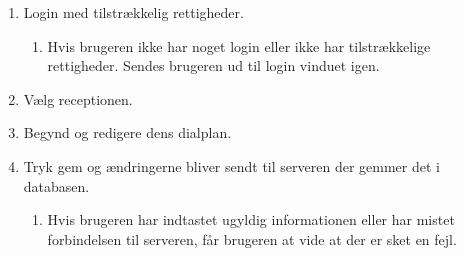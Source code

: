 \begin{enumerate}
    \item Login med tilstrækkelig rettigheder.
  \begin{enumerate}
    \item Hvis brugeren ikke har noget login eller ikke har tilstrækkelige rettigheder. Sendes brugeren ud til login vinduet igen.
  \end{enumerate}
    \item Vælg receptionen.
    \item Begynd og redigere dens dialplan.
    \item Tryk gem og ændringerne bliver sendt til serveren der gemmer det i databasen.
  \begin{enumerate}
    \item Hvis brugeren har indtastet ugyldig informationen eller har mistet forbindelsen til serveren, får brugeren at vide at der er sket en fejl.
  \end{enumerate}
\end{enumerate}